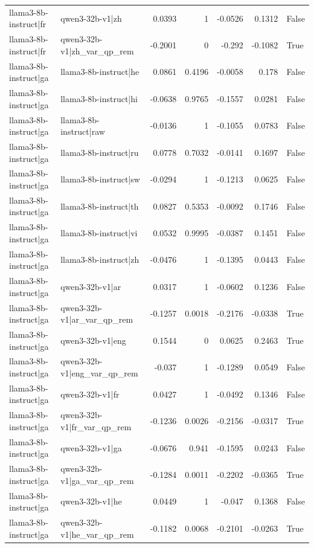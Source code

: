 \begin{table}
\begin{tabular}{l l r r r r l}
llama3-8b-instruct|fr & qwen3-32b-v1|zh & 0.0393 & 1 & -0.0526 & 0.1312 & False \\
llama3-8b-instruct|fr & qwen3-32b-v1|zh_var_qp_rem & -0.2001 & 0 & -0.292 & -0.1082 & True \\
llama3-8b-instruct|ga & llama3-8b-instruct|he & 0.0861 & 0.4196 & -0.0058 & 0.178 & False \\
llama3-8b-instruct|ga & llama3-8b-instruct|hi & -0.0638 & 0.9765 & -0.1557 & 0.0281 & False \\
llama3-8b-instruct|ga & llama3-8b-instruct|raw & -0.0136 & 1 & -0.1055 & 0.0783 & False \\
llama3-8b-instruct|ga & llama3-8b-instruct|ru & 0.0778 & 0.7032 & -0.0141 & 0.1697 & False \\
llama3-8b-instruct|ga & llama3-8b-instruct|sw & -0.0294 & 1 & -0.1213 & 0.0625 & False \\
llama3-8b-instruct|ga & llama3-8b-instruct|th & 0.0827 & 0.5353 & -0.0092 & 0.1746 & False \\
llama3-8b-instruct|ga & llama3-8b-instruct|vi & 0.0532 & 0.9995 & -0.0387 & 0.1451 & False \\
llama3-8b-instruct|ga & llama3-8b-instruct|zh & -0.0476 & 1 & -0.1395 & 0.0443 & False \\
llama3-8b-instruct|ga & qwen3-32b-v1|ar & 0.0317 & 1 & -0.0602 & 0.1236 & False \\
llama3-8b-instruct|ga & qwen3-32b-v1|ar_var_qp_rem & -0.1257 & 0.0018 & -0.2176 & -0.0338 & True \\
llama3-8b-instruct|ga & qwen3-32b-v1|eng & 0.1544 & 0 & 0.0625 & 0.2463 & True \\
llama3-8b-instruct|ga & qwen3-32b-v1|eng_var_qp_rem & -0.037 & 1 & -0.1289 & 0.0549 & False \\
llama3-8b-instruct|ga & qwen3-32b-v1|fr & 0.0427 & 1 & -0.0492 & 0.1346 & False \\
llama3-8b-instruct|ga & qwen3-32b-v1|fr_var_qp_rem & -0.1236 & 0.0026 & -0.2156 & -0.0317 & True \\
llama3-8b-instruct|ga & qwen3-32b-v1|ga & -0.0676 & 0.941 & -0.1595 & 0.0243 & False \\
llama3-8b-instruct|ga & qwen3-32b-v1|ga_var_qp_rem & -0.1284 & 0.0011 & -0.2202 & -0.0365 & True \\
llama3-8b-instruct|ga & qwen3-32b-v1|he & 0.0449 & 1 & -0.047 & 0.1368 & False \\
llama3-8b-instruct|ga & qwen3-32b-v1|he_var_qp_rem & -0.1182 & 0.0068 & -0.2101 & -0.0263 & True \\

\end{tabular}
\end{table}
